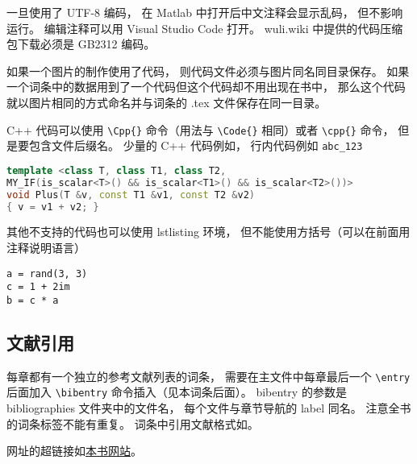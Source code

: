 一旦使用了 UTF-8 编码， 在 Matlab 中打开后中文注释会显示乱码， 但不影响运行。 编辑注释可以用 Visual Studio Code 打开。 wuli.wiki 中提供的代码压缩包下载必须是 GB2312 编码。

如果一个图片的制作使用了代码， 则代码文件必须与图片同名同目录保存。 如果一个词条中的数据用到了一个代码但这个代码却不用出现在书中， 那么这个代码就以图片相同的方式命名并与词条的 .tex 文件保存在同一目录。 


C++ 代码可以使用 \lstinline|\Cpp{}| 命令（用法与 \lstinline|\Code{}| 相同）或者 \lstinline|\cpp{}| 命令， 但是要包含文件后缀名。 少量的 C++ 代码例如， 行内代码例如 \lstinline|abc_123|
\begin{lstlisting}[language=cpp]
template <class T, class T1, class T2,
MY_IF(is_scalar<T>() && is_scalar<T1>() && is_scalar<T2>())>
void Plus(T &v, const T1 &v1, const T2 &v2)
{ v = v1 + v2; }
\end{lstlisting}

其他不支持的代码也可以使用 lstlisting 环境， 但不能使用方括号（可以在前面用注释说明语言）
\begin{lstlisting}
a = rand(3, 3)
c = 1 + 2im
b = c * a
\end{lstlisting}


\subsection{文献引用}
每章都有一个独立的参考文献列表的词条， 需要在主文件中每章最后一个 \lstinline|\entry| 后面加入 \lstinline|\bibentry| 命令插入（见本词条后面）。 bibentry 的参数是 bibliographies 文件夹中的文件名， 每个文件与章节导航的 label 同名。 注意全书的词条标签不能有重复。 词条中引用文献格式如\cite{PhysWiki}\cite{PhysWikiEng}。

网址的超链接如\href{http://wuli.wiki}{本书网站}。
